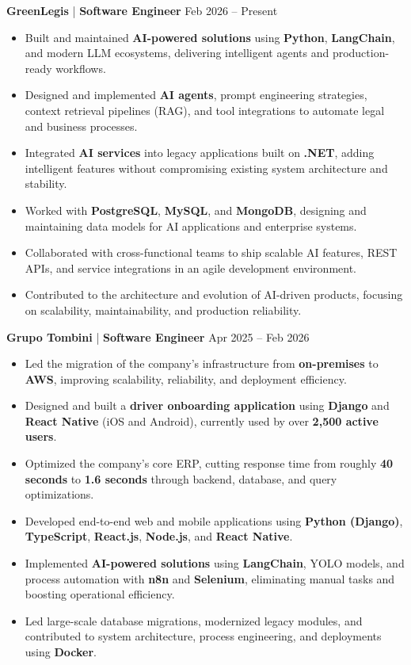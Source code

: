 \textbf{GreenLegis} | \textbf{Software Engineer} \hfill Feb 2026 – Present
\vspace{-3mm}
\begin{itemize} \itemsep -3pt
    \item Built and maintained \textbf{AI-powered solutions} using \textbf{Python}, \textbf{LangChain}, and modern LLM ecosystems, delivering intelligent agents and production-ready workflows.
    \item Designed and implemented \textbf{AI agents}, prompt engineering strategies, context retrieval pipelines (RAG), and tool integrations to automate legal and business processes.
    \item Integrated \textbf{AI services} into legacy applications built on \textbf{.NET}, adding intelligent features without compromising existing system architecture and stability.
    \item Worked with \textbf{PostgreSQL}, \textbf{MySQL}, and \textbf{MongoDB}, designing and maintaining data models for AI applications and enterprise systems.
    \item Collaborated with cross-functional teams to ship scalable AI features, REST APIs, and service integrations in an agile development environment.
    \item Contributed to the architecture and evolution of AI-driven products, focusing on scalability, maintainability, and production reliability.
\end{itemize}

\textbf{Grupo Tombini} | \textbf{Software Engineer} \hfill Apr 2025 – Feb 2026
\vspace{-3mm}
\begin{itemize} \itemsep -3pt
    \item Led the migration of the company's infrastructure from \textbf{on-premises} to \textbf{AWS}, improving scalability, reliability, and deployment efficiency.
    \item Designed and built a \textbf{driver onboarding application} using \textbf{Django} and \textbf{React Native} (iOS and Android), currently used by over \textbf{2,500 active users}.
    \item Optimized the company's core ERP, cutting response time from roughly \textbf{40 seconds} to \textbf{1.6 seconds} through backend, database, and query optimizations.
    \item Developed end-to-end web and mobile applications using \textbf{Python (Django)}, \textbf{TypeScript}, \textbf{React.js}, \textbf{Node.js}, and \textbf{React Native}.
    \item Implemented \textbf{AI-powered solutions} using \textbf{LangChain}, YOLO models, and process automation with \textbf{n8n} and \textbf{Selenium}, eliminating manual tasks and boosting operational efficiency.
    \item Led large-scale database migrations, modernized legacy modules, and contributed to system architecture, process engineering, and deployments using \textbf{Docker}.
\end{itemize}


